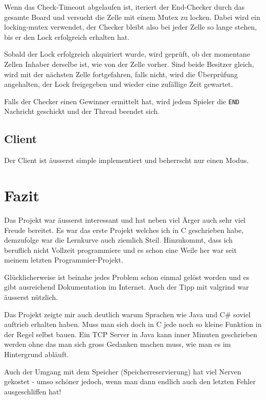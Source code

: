 Wenn das Check-Timeout abgelaufen ist, iteriert der End-Checker durch das gesamte Board und versucht die Zelle mit einem Mutex zu locken. Dabei wird ein locking-mutex verwendet, der Checker bleibt also bei jeder Zelle so lange stehen, bis er den Lock erfolgreich erhalten hat. 

Sobald der Lock erfolgreich akquiriert wurde, wird geprüft, ob der momentane Zellen Inhaber derselbe ist, wie von der Zelle vorher. Sind beide Besitzer gleich, wird mit der nächsten Zelle fortgefahren, falls nicht, wird die Überprüfung angehalten, der Lock freigegeben und wieder eine zufällige Zeit gewartet.

Falls der Checker einen Gewinner ermittelt hat, wird jedem Spieler die \texttt{END} Nachricht geschickt und der Thread beendet sich.  

\section{Client}
Der Client ist äusserst simple implementiert und beherrscht nur einen Modus.

\chapter{Fazit}
Das Projekt war äusserst interessant und hat neben viel Ärger auch sehr viel Freude bereitet. Es war das erste Projekt welches ich in C geschrieben habe, demzufolge war die Lernkurve auch ziemlich Steil. Hinzukommt, dass ich beruflich nicht Vollzeit programmiere und es schon eine Weile her war seit meinem letzten Programmier-Projekt.

Glücklicherweise ist beinahe jedes Problem schon einmal gelöst worden und es gibt ausreichend Dokumentation im Internet. Auch der Tipp mit valgrind war äusserst nützlich. 

Das Projekt zeigte mir auch deutlich warum Sprachen wie Java und C\# soviel auftrieb erhalten haben. Muss man sich doch in C jede noch so kleine Funktion in der Regel selbst bauen. Ein TCP Server in Java kann inner Minuten geschrieben werden ohne das man sich gross Gedanken machen muss, wie man es im Hintergrund abläuft.

Auch der Umgang mit dem Speicher (Speicherreservierung) hat viel Nerven gekostet - umso schöner jedoch, wenn man dann endlich auch den letzten Fehler ausgeschliffen hat!